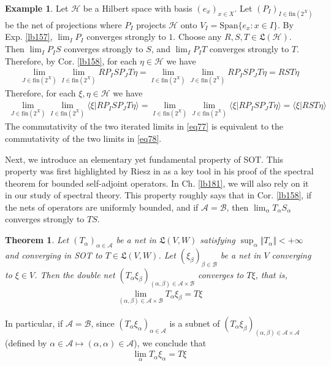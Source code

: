 \documentclass[12pt,b5paper,notitlepage]{article}
\theoremstyle{definition}
\newtheorem{eg}[df]{Example}
\theoremstyle{plain}
\newtheorem{thm}[df]{Theorem}
\newcommand{\fk}{\mathfrak}
\newcommand{\Span}{\mathrm{Span}}
\newcommand{\bk}[1]{\langle {#1}\rangle}
\newcommand{\scr}{\mathscr}
\newcommand{\fin}{\mathrm{fin}}
\newcommand{\MH}{\mathcal H}
\numberwithin{equation}{section}
\begin{document}
\begin{eg}\label{lb160}
Let $\MH$ be a Hilbert space with basis $(e_x)_{x\in X}$. Let $(P_I)_{I\in\fin(2^X)}$ be the net of projections where $P_I$ projects $\MH$ onto $V_I=\Span\{e_x:x\in I\}$. By Exp. \ref{lb157}, $\lim_I P_I$ converges strongly to $1$. Choose any $R,S,T\in\fk L(\MH)$. Then $\lim_I P_IS$ converges strongly to $S$, and $\lim_I P_IT$ converges strongly to $T$. Therefore, by Cor. \ref{lb158}, for each $\eta\in\MH$ we have
\begin{align*}
\lim_{J\in\fin(2^X)}\lim_{I\in\fin(2^X)}RP_ISP_JT\eta=\lim_{I\in\fin(2^X)}\lim_{J\in\fin(2^X)}RP_ISP_JT\eta=RST\eta
\end{align*}
Therefore, for each $\xi,\eta\in\MH$ we have
\begin{align}\label{eq77}
\lim_{J\in\fin(2^X)}\lim_{I\in\fin(2^X)}\bk{\xi|RP_ISP_JT\eta}=\lim_{I\in\fin(2^X)}\lim_{J\in\fin(2^X)}\bk{\xi|RP_ISP_JT\eta}=\bk{\xi|RST\eta}
\end{align}
The commutativity of the two iterated limits in \eqref{eq77} is equivalent to the commutativity of the two limits in \eqref{eq78}.
\end{eg}




Next, we introduce an elementary yet fundamental property of SOT. This property was first highlighted by Riesz in \cite{Rie11} as a key tool in his proof of the spectral theorem for bounded self-adjoint operators. In Ch. \ref{lb181}, we will also rely on it in our study of spectral theory. This property roughly says that in Cor. \ref{lb158}, if the nets of operators are uniformly bounded, and if $\scr A=\scr B$, then $\lim_\alpha T_\alpha S_\alpha$ converges strongly to $TS$.


\begin{thm}\label{lb155}
Let $(T_\alpha)_{\alpha\in\scr A}$ be a net in $\fk L(V,W)$ satisfying $\sup_\alpha\Vert T_\alpha\Vert<+\infty$ and converging in SOT to $T\in\fk L(V,W)$. Let $(\xi_\beta)_{\beta\in\scr B}$ be a net in $V$ converging to $\xi\in V$. Then the double net $(T_\alpha\xi_\beta)_{(\alpha,\beta)\in\scr A\times\scr B}$ converges to $T\xi$, that is,
\begin{align*}
\lim_{(\alpha,\beta)\in\scr A\times\scr B}T_\alpha\xi_\beta=T\xi
\end{align*}
\end{thm}

In particular, if $\scr A=\scr B$, since $(T_\alpha\xi_\alpha)_{\alpha\in\scr A}$ is a subnet of $(T_\alpha\xi_\beta)_{(\alpha,\beta)\in\scr A\times\scr A}$ (defined by $\alpha\in\scr A\mapsto(\alpha,\alpha)\in\scr A$), we conclude that
\begin{align*}
\lim_\alpha T_\alpha\xi_\alpha=T\xi
\end{align*}
\end{document}
